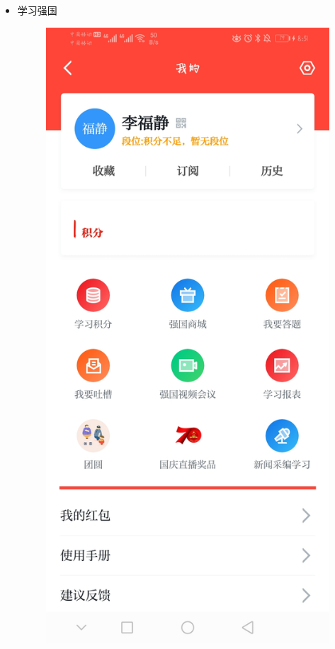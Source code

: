 \documentclass{article}
\begin{document}
\begin{itemize}
\begin{figure}[h!]
   	\label{fig:b}
   \end{figure}
   \newpage
   \item 学习强国\par
   \begin{figure}[h!]
   	\centering
   	\includegraphics[scale=0.1]{c}
   	\caption{}
   	\label{fig:c}
   \end{figure}
   

\end{itemize}
\end{document}
